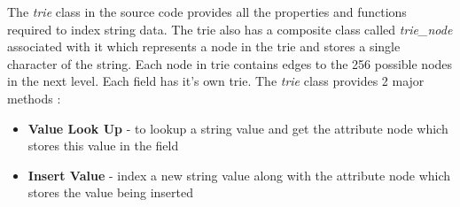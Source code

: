 \documentclass[12pt, oneside]{book}
\begin{document}
The \emph{trie} class in the source code provides all the properties and functions required to index string data. The trie also has a composite class called \emph{trie\_node} associated with it which represents a node in the trie and stores a single character of the string. Each node in trie contains edges to the 256 possible nodes in the next level. Each field has it's own trie. The \emph{trie} class provides 2 major methods :
\begin{itemize}
 \item \textbf{Value Look Up} - to lookup a string value and get the attribute node which stores this value in the field
 \item \textbf{Insert Value} - index a new string value along with the attribute node which stores the value being inserted
\end{itemize}
\end{document}
